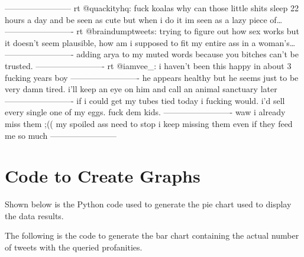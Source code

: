 \documentclass{article}
\begin{document}
\begin{flushleft}------------------------\newline
rt @quackityhq: fuck koalas why can those little shits sleep 22 hours a day and be seen as cute but when i do it im seen as a lazy piece of…\newline
-------------------------\newline
rt @braindumptweets: trying to figure out how sex works but it doesn't seem plausible, how am i supposed to fit my entire ass in a woman's…\newline
-------------------------\newline
adding arya to my muted words because you bitches can’t be trusted.\newline
-------------------------\newline
rt @iamvee\_: i haven’t been this happy in about 3 fucking years boy\newline
-------------------------\newline
he appears healthy but he seems just to be very damn tired. i'll keep an eye on him and call an animal sanctuary later\newline
-------------------------\newline
if i could get my tubes tied today i fucking would. i’d sell every single one of my eggs. fuck dem kids.\newline
-------------------------\newline
waw i already miss them ;(( my spoiled ass need to stop i keep missing them even if they feed me so much\newline
------------------------\newline
\end{flushleft}

\section{Code to Create Graphs}
\tab Shown below is the Python code used to generate the pie chart used to display the data results.\newline



The following is the code to generate the bar chart containing the actual number of tweets with the queried profanities.\newline


\end{document}
